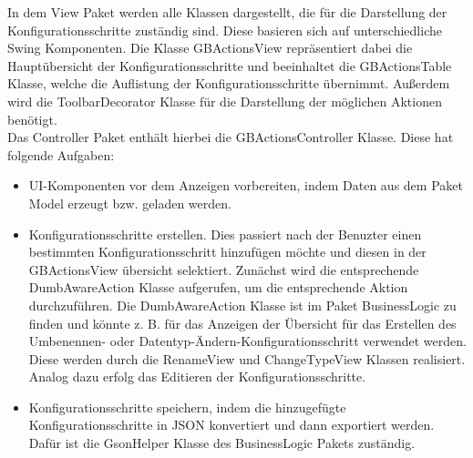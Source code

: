 In dem View Paket werden alle Klassen dargestellt, die für die Darstellung der Konfigurationsschritte zuständig sind. Diese basieren sich auf unterschiedliche Swing Komponenten. Die Klasse GBActionsView repräsentiert dabei die Hauptübersicht der Konfigurationsschritte und beeinhaltet die GBActionsTable Klasse, welche die Auflistung der Konfigurationsschritte übernimmt. Außerdem wird die ToolbarDecorator Klasse für die Darstellung der möglichen Aktionen benötigt. \\
Das Controller Paket enthält hierbei die GBActionsController Klasse. Diese hat folgende Aufgaben:
\begin{itemize}
	\item UI-Komponenten vor dem Anzeigen vorbereiten, indem Daten aus dem Paket Model erzeugt bzw. geladen werden.
	\item Konfigurationsschritte erstellen. Dies passiert nach der Benuzter einen bestimmten Konfigurationsschritt hinzufügen möchte und diesen in der GBActionsView übersicht selektiert. Zunächst wird die entsprechende DumbAwareAction Klasse aufgerufen, um die entsprechende Aktion durchzuführen. Die DumbAwareAction Klasse ist im Paket BusinessLogic zu finden und könnte z. B. für das Anzeigen der Übersicht für das Erstellen des Umbenennen- oder Datentyp-Ändern-Konfigurationsschritt verwendet werden. Diese werden durch die RenameView und ChangeTypeView Klassen realisiert. Analog dazu erfolg das Editieren der Konfigurationsschritte.
	\item Konfigurationsschritte speichern, indem die hinzugefügte Konfigurationsschritte in JSON konvertiert und dann exportiert werden. Dafür ist die GsonHelper Klasse des BusinessLogic Pakets zuständig.
\end{itemize}



